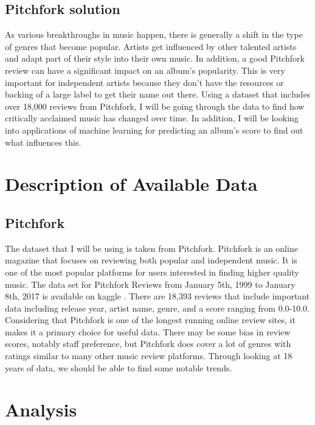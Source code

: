 \documentclass{article}
\begin{document}
\subsection{Pitchfork solution}\label{pitchfork-solution}

As various breakthroughs in music happen, there is generally a shift in
the type of genres that become popular. Artists get influenced by other
talented artists and adapt part of their style into their own music. In
addition, a good Pitchfork review can have a significant impact on an
album's popularity. This is very important for independent artists
because they don't have the resources or backing of a large label to get
their name out there. Using a dataset that includes over 18,000 reviews
from Pitchfork, I will be going through the data to find how critically
acclaimed music has changed over time. In addition, I will be looking
into applications of machine learning for predicting an album's score to
find out what influences this.

\section{Description of Available
Data}\label{description-of-available-data}

\subsection{Pitchfork}\label{pitchfork}

The dataset that I will be using is taken from Pitchfork. Pitchfork is
an online magazine that focuses on reviewing both popular and
independent music. It is one of the most popular platforms for users
interested in finding higher quality music. The data set for Pitchfork
Reviews from January 5th, 1999 to January 8th, 2017 is available on
kaggle \citep{kaggle}. There are 18,393 reviews that include important
data including release year, artist name, genre, and a score ranging
from 0.0-10.0. Considering that Pitchfork is one of the longest running
online review sites, it makes it a primary choice for useful data. There
may be some bias in review scores, notably staff preference, but
Pitchfork does cover a lot of genres with ratings similar to many other
music review platforms. Through looking at 18 years of data, we should
be able to find some notable trends.

\section{Analysis}\label{analysis}
\end{document}
